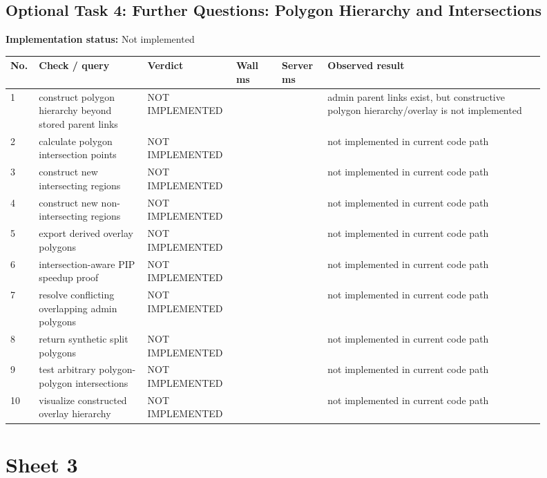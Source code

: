 \documentclass[10pt,a4paper]{article}
\begin{document}
\subsection{Optional Task 4: Further Questions: Polygon Hierarchy and Intersections}
\textbf{Implementation status:} Not implemented\\
\scriptsize
\begin{longtable}{|P{0.045\linewidth}|P{0.19\linewidth}|P{0.105\linewidth}|P{0.085\linewidth}|P{0.085\linewidth}|P{0.385\linewidth}|}
\hline
\textbf{No.} & \textbf{Check / query} & \textbf{Verdict} & \textbf{Wall ms} & \textbf{Server ms} & \textbf{Observed result}\\ \hline
{} 1 & construct polygon hierarchy beyond stored parent links & NOT IMPLEMENTED &  &  & admin parent links exist, but constructive polygon hierarchy/overlay is not implemented\\ \hline
{} 2 & calculate polygon intersection points & NOT IMPLEMENTED &  &  & not implemented in current code path\\ \hline
{} 3 & construct new intersecting regions & NOT IMPLEMENTED &  &  & not implemented in current code path\\ \hline
{} 4 & construct new non-intersecting regions & NOT IMPLEMENTED &  &  & not implemented in current code path\\ \hline
{} 5 & export derived overlay polygons & NOT IMPLEMENTED &  &  & not implemented in current code path\\ \hline
{} 6 & intersection-aware PIP speedup proof & NOT IMPLEMENTED &  &  & not implemented in current code path\\ \hline
{} 7 & resolve conflicting overlapping admin polygons & NOT IMPLEMENTED &  &  & not implemented in current code path\\ \hline
{} 8 & return synthetic split polygons & NOT IMPLEMENTED &  &  & not implemented in current code path\\ \hline
{} 9 & test arbitrary polygon-polygon intersections & NOT IMPLEMENTED &  &  & not implemented in current code path\\ \hline
{} 10 & visualize constructed overlay hierarchy & NOT IMPLEMENTED &  &  & not implemented in current code path\\ \hline
\end{longtable}
\normalsize
\clearpage
\section{Sheet 3}
\end{document}
